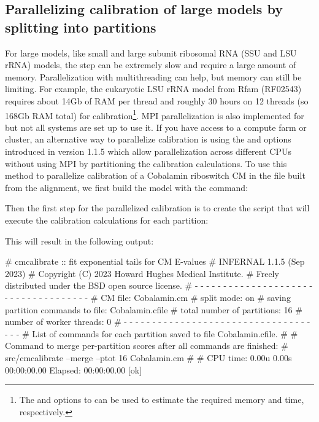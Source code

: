 \newpage

\subsection{Parallelizing calibration of large models by splitting
  into partitions}

For large models, like small and large subunit ribosomal RNA (SSU and
LSU rRNA) models, the  step can be extremely slow
and require a large amount of memory. Parallelization with
multithreading can help, but memory can still be limiting. For
example, the eukaryotic LSU rRNA model from Rfam (RF02543) requires
about 14Gb of RAM per thread and roughly 30 hours on 12 threads (so
168Gb RAM total) for calibration\footnote{The  and
   options to  can be used to
  estimate the required memory and time, respectively.}.  MPI
parallelization is also implemented for  but not all
systems are set up to use it. If you have access to a compute farm or
cluster, an alternative way to parallelize calibration is
using the  and  options introduced in
version 1.1.5 which allow parallelization across different CPUs
without using MPI by partitioning the calibration calculations. To use
this method to parallelize calibration of a Cobalamin riboswitch CM
in the file built from the  alignment, we
first build the model with the command:


Then the first step for the parallelized calibration is to create the
script that will execute the calibration calculations for each partition:


This will result in the following output:

\begin{sreoutput}
# cmcalibrate :: fit exponential tails for CM E-values
# INFERNAL 1.1.5 (Sep 2023)
# Copyright (C) 2023 Howard Hughes Medical Institute.
# Freely distributed under the BSD open source license.
# - - - - - - - - - - - - - - - - - - - - - - - - - - - - - - - - - - - -
# CM file:                                     Cobalamin.cm
# split mode:                                  on
# saving partition commands to file:           Cobalamin.cfile
# total number of partitions:                  16
# number of worker threads:                    0
# - - - - - - - - - - - - - - - - - - - - - - - - - - - - - - - - - - - -
# List of commands for each partition saved to file Cobalamin.cfile.
#
# Command to merge per-partition scores after all commands are finished:
# src/cmcalibrate --merge --ptot 16 Cobalamin.cm
#
# CPU time: 0.00u 0.00s 00:00:00.00 Elapsed: 00:00:00.00
[ok]
\end{sreoutput}

